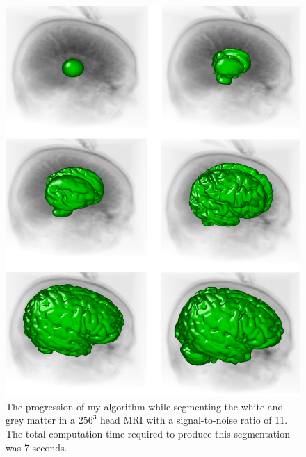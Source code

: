 \begin{figure}[t]
\centering
\includegraphics[width=6.0in]{figures/Brainweb-3D-Composite-NoText.png}
\caption{The progression of my algorithm while segmenting the white and grey matter in a $256^3$ head MRI with a signal-to-noise ratio of 11. The total computation time required to produce this segmentation was 7 seconds.}
\label{fig:brainweb3d}
\end{figure}

